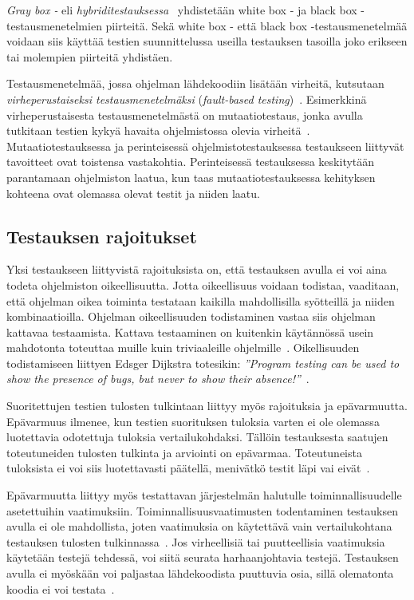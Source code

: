 \documentclass[finnish, grading]{tktltiki2}
\theoremstyle{definition}
\theoremstyle{remark}
\begin{document}
\textit{Gray box -} eli \textit{hybriditestauksessa}~\cite[s. 52]{Binder:1999} yhdistetään white box - ja black box -testausmenetelmien piirteitä. Sekä white box - että black box -testausmenetelmää voidaan siis käyttää testien suunnittelussa useilla testauksen tasoilla joko erikseen tai molempien piirteitä yhdistäen.

Testausmenetelmää, jossa ohjelman lähdekoodiin lisätään virheitä, kutsutaan \textit{virheperustaiseksi testausmenetelmäksi} (\textit{fault-based testing})~\cite[s. 52]{Binder:1999}. Esimerkkinä virheperustaisesta testausmenetelmästä on mutaatiotestaus, jonka avulla tutkitaan testien kykyä havaita ohjelmistossa olevia virheitä~\cite[s. 36]{DeMillo:Lipton:Sayward:1978}. Mutaatiotestauksessa ja perinteisessä ohjelmistotestauksessa testaukseen liittyvät tavoitteet ovat toistensa vastakohtia. Perinteisessä testauksessa keskitytään parantamaan ohjelmiston laatua, kun taas mutaatiotestauksessa kehityksen kohteena ovat olemassa olevat testit ja niiden laatu.

\subsection{Testauksen rajoitukset}

Yksi testaukseen liittyvistä rajoituksista on, että testauksen avulla ei voi aina todeta ohjelmiston oikeellisuutta. Jotta oikeellisuus voidaan todistaa, vaaditaan, että ohjelman oikea toiminta testataan kaikilla mahdollisilla syötteillä ja niiden kombinaatioilla. Ohjelman oikeellisuuden todistaminen vastaa siis ohjelman kattavaa testaamista. Kattava testaaminen on kuitenkin käytännössä usein mahdotonta toteuttaa muille kuin triviaaleille ohjelmille~\cite[s. 58]{Binder:1999}. Oikellisuuden todistamiseen liittyen Edsger Dijkstra totesikin: \textit{''Program testing can be used to show the presence of bugs, but never to show their absence!''}~\cite[s. 6]{Dahl:Dijkstra:Hoare:1972}.

Suoritettujen testien tulosten tulkintaan liittyy myös rajoituksia ja epävarmuutta. Epävarmuus ilmenee, kun testien suorituksen tuloksia varten ei ole olemassa luotettavia odotettuja tuloksia vertailukohdaksi. Tällöin testauksesta saatujen toteutuneiden tulosten tulkinta ja arviointi on epävarmaa. Toteutuneista tuloksista ei voi siis luotettavasti päätellä, menivätkö testit läpi vai eivät~\cite[s. 58]{Binder:1999}. 

Epävarmuutta liittyy myös testattavan järjestelmän halutulle toiminnallisuudelle asetettuihin vaatimuksiin. Toiminnallisuusvaatimusten todentaminen testauksen avulla ei ole mahdollista, joten vaatimuksia on käytettävä vain vertailukohtana testauksen tulosten tulkinnassa~\cite[s. 58]{Binder:1999}. Jos virheellisiä tai puutteellisia vaatimuksia käytetään testejä tehdessä, voi siitä seurata harhaanjohtavia testejä. Testauksen avulla ei myöskään voi paljastaa lähdekoodista puuttuvia osia, sillä olematonta koodia ei voi testata~\cite[s. 58]{Binder:1999}.
\end{document}
